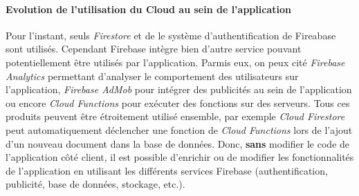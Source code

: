 \paragraph{Evolution de l'utilisation du Cloud au sein de l'application}
Pour l'instant, seuls \textit{Firestore} et de le système d'authentification de Fireabase sont utilisés. Cependant Firebase intègre bien d'autre service pouvant potentiellement être utilisés par l'application. Parmis eux, on peux cité \textit{Firebase Analytics} permettant d'analyser le comportement des utilisateurs sur l'application, \textit{Firebase AdMob} pour intégrer des publicités au sein de l'application ou encore \textit{Cloud Functions} pour exécuter des fonctions sur des serveurs. Tous ces produits peuvent être étroitement utilisé ensemble, par exemple \textit{Cloud Firestore} peut automatiquement déclencher une fonction de  \textit{Cloud Functions} lors de l'ajout d'un nouveau document dans la base de données. Donc, \textbf{sans} modifier le code de l'application côté client, il est possible d'enrichir ou de modifier les fonctionnalités de l'application en utilisant les différents services Firebase (authentification, publicité, base de données, stockage, etc.).

